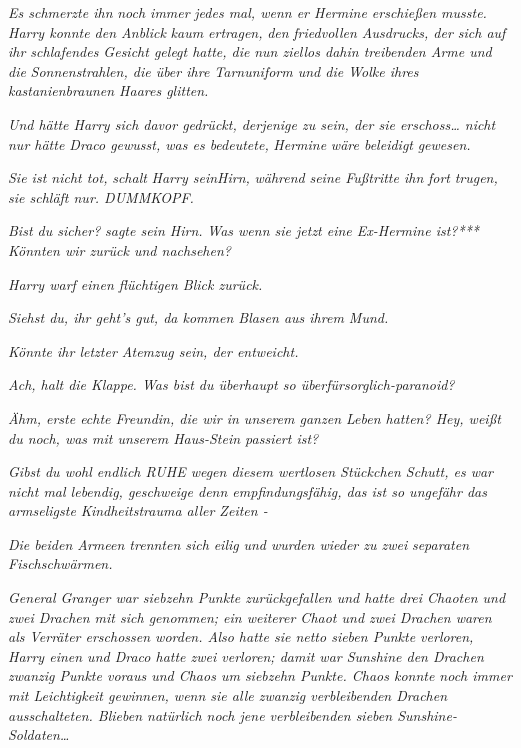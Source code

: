 {\emph{Es schmerzte ihn} \emph{noch immer} \emph{jedes mal, wenn er Hermine erschießen musste. Harry konnte den Anblick} \emph{kaum ertragen,} \emph{den} \emph{friedvollen Ausdrucks, der sich auf ihr schlafendes Gesicht gelegt hatte, die} \emph{nun ziellos dahin treibenden Arme und die} \emph{Sonnenstrahlen, die über ihre Tarnuniform und die Wolke ihres kastanienbraunen Haares glitten.}

\emph{Und hätte Harry sich davor gedrückt, derjenige zu sein, der sie erschoss… nicht nur hätte Draco gewusst, was es bedeutete,} \emph{\emph{Hermine}} \emph{wäre beleidigt} \emph{gewesen.}

\emph{\emph{Sie ist nicht tot,}} \emph{schalt} \emph{Harry seinHirn,} \emph{während} \emph{seine Fußtritte ihn} \emph{fort} \emph{trugen,} \emph{\emph{sie schläft nur. DUMMKOPF.}}

\emph{\emph{Bist du sicher?}} \emph{sagte sein Hirn.} \emph{\emph{Was wenn sie jetzt eine Ex-Hermine ist?}***} \emph{\emph{Könnten wir zurück und nachsehen?}}

\emph{Harry warf einen flüchtigen Blick zurück.}

\emph{\emph{Siehst du, ihr geht's gut, da kommen Blasen aus ihrem Mund.}}

\emph{\emph{Könnte ihr letzter Atemzug sein, der entweicht.}}

\emph{\emph{Ach, halt die Klappe. Was bist du überhaupt so überfürsorglich-paranoid?}}

\emph{\emph{Ähm, erste echte Freundin, die wir in unserem ganzen Leben hatten? Hey, weißt du noch, was mit unserem Haus-Stein passiert ist?}}

\emph{\emph{Gibst du wohl endlich RUHE wegen diesem wertlosen Stückchen Schutt, es war nicht mal lebendig, geschweige denn empfindungsfähig, das ist so ungefähr das armseligste Kindheitstrauma aller Zeiten -}}

\emph{Die beiden Armeen trennten sich} \emph{eilig} \emph{und wurden wieder zu zwei} \emph{separaten} \emph{Fischschwärmen.}

\emph{General Granger war siebzehn Punkte zurückgefallen und hatte} \emph{drei Chaoten und zwei Drachen mit sich genommen; ein weiterer Chaot und zwei Drachen waren als Verräter erschossen worden. Also hatte sie netto sieben Punkte verloren, Harry einen und Draco hatte zwei verloren; damit war Sunshine den Drachen zwanzig Punkte voraus und Chaos um siebzehn Punkte. Chaos konnte noch immer mit Leichtigkeit gewinnen, wenn sie alle zwanzig verbleibenden Drachen ausschalteten. Blieben natürlich noch jene verbleibenden sieben Sunshine-Soldaten…}

}
